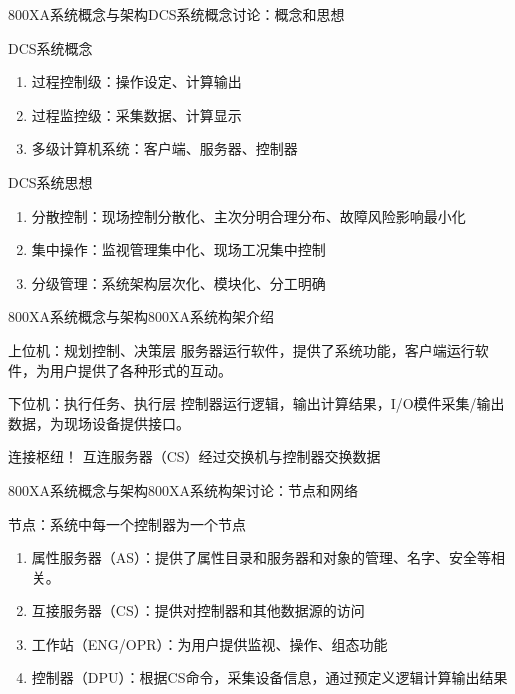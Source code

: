 \documentclass[12pt,hyperref={CJKbookmarks=true}]{beamer} %
\begin{document}
\begin{frame}{800XA系统概念与架构}{DCS系统概念讨论：概念和思想}
		\begin{block}{DCS系统概念}
			\begin{enumerate}[]
				\item  过程控制级：操作设定、计算输出
				
				\item  过程监控级：采集数据、计算显示
				
				\item  多级计算机系统：客户端、服务器、控制器

			\end{enumerate}
		\end{block}
\pause
\begin{block}{DCS系统思想}
			\begin{enumerate}
				\item  分散控制：现场控制分散化、主次分明合理分布、故障风险影响最小化
				
				\item  集中操作：监视管理集中化、现场工况集中控制
				
				\item  分级管理：系统架构层次化、模块化、分工明确
			\end{enumerate}
		\end{block}
	\end{frame}
\begin{frame}{800XA系统概念与架构}{800XA系统构架介绍}
\begin{block}{上位机：规划控制、决策层}
服务器运行软件，提供了系统功能，客户端运行软件，为用户提供了各种形式的互动。
		\end{block}
		\begin{exampleblock}{下位机：执行任务、执行层}
			控制器运行逻辑，输出计算结果，I/O模件采集/输出数据，为现场设备提供接口。
		\end{exampleblock}
		\begin{alertblock}{\heiti 连接枢纽！}
			互连服务器（CS）经过交换机与控制器交换数据
		\end{alertblock}
		
	\end{frame}
\begin{frame}{800XA系统概念与架构}{800XA系统构架讨论：节点和网络}
		\begin{block}{节点：系统中每一个控制器为一个节点}
			\begin{enumerate}
				\item  属性服务器（AS）：提供了属性目录和服务器和对象的管理、名字、安全等相关。
				
				\item  互接服务器（CS）：提供对控制器和其他数据源的访问
				
				\item  工作站（ENG/OPR）：为用户提供监视、操作、组态功能
				
				\item  控制器（DPU）：根据CS命令，采集设备信息，通过预定义逻辑计算输出结果
			\end{enumerate}
		\end{block}
\end{frame}
\end{document}
